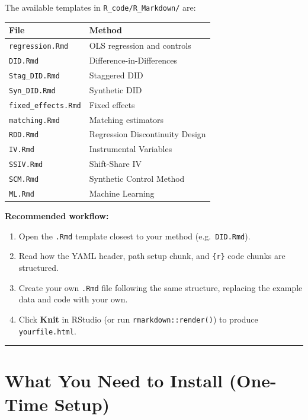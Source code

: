 \documentclass[paper=a4, fontsize=11pt]{scrartcl}
\newcommand{\horrule}[1]{\rule{\linewidth}{#1}}
\begin{document}
\medskip
The available templates in \texttt{R\_code/R\_Markdown/} are:

\medskip
\begin{center}
\begin{tabular}{ll}
\toprule
\textbf{File} & \textbf{Method} \\
\midrule
\texttt{regression.Rmd}     & OLS regression and controls \\
\texttt{DID.Rmd}            & Difference-in-Differences \\
\texttt{Stag\_DID.Rmd}      & Staggered DID \\
\texttt{Syn\_DID.Rmd}       & Synthetic DID \\
\texttt{fixed\_effects.Rmd} & Fixed effects \\
\texttt{matching.Rmd}       & Matching estimators \\
\texttt{RDD.Rmd}            & Regression Discontinuity Design \\
\texttt{IV.Rmd}             & Instrumental Variables \\
\texttt{SSIV.Rmd}           & Shift-Share IV \\
\texttt{SCM.Rmd}            & Synthetic Control Method \\
\texttt{ML.Rmd}             & Machine Learning \\
\bottomrule
\end{tabular}
\end{center}

\begin{tipbox}
\textbf{Recommended workflow:}
\begin{enumerate}
  \item Open the \texttt{.Rmd} template closest to your method (e.g.\ \texttt{DID.Rmd}).
  \item Read how the YAML header, path setup chunk, and \texttt{\{r\}} code chunks are structured.
  \item Create your own \texttt{.Rmd} file following the same structure, replacing the
        example data and code with your own.
  \item Click \textbf{Knit} in RStudio (or run \texttt{rmarkdown::render()}) to produce
        \texttt{yourfile.html}.
\end{enumerate}
\end{tipbox}

\bigskip\horrule{0.4pt}\bigskip

\section{What You Need to Install (One-Time Setup)}
\end{document}
